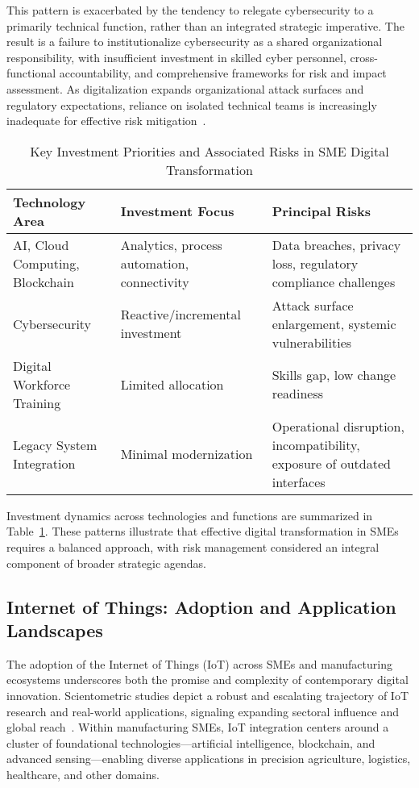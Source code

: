 \documentclass[11pt]{article}
\begin{document}
This pattern is exacerbated by the tendency to relegate cybersecurity to a primarily technical function, rather than an integrated strategic imperative. The result is a failure to institutionalize cybersecurity as a shared organizational responsibility, with insufficient investment in skilled cyber personnel, cross-functional accountability, and comprehensive frameworks for risk and impact assessment. As digitalization expands organizational attack surfaces and regulatory expectations, reliance on isolated technical teams is increasingly inadequate for effective risk mitigation~\cite{ref35}.

\begin{table}[htbp]
\centering
\caption{Key Investment Priorities and Associated Risks in SME Digital Transformation}
\label{tab:investment_risks}
\begin{tabular}{|l|p{5cm}|p{4cm}|}
\hline
\textbf{Technology Area} & \textbf{Investment Focus} & \textbf{Principal Risks} \\
\hline
AI, Cloud Computing, Blockchain & Analytics, process automation, connectivity & Data breaches, privacy loss, regulatory compliance challenges \\
\hline
Cybersecurity & Reactive/incremental investment & Attack surface enlargement, systemic vulnerabilities \\
\hline
Digital Workforce Training & Limited allocation & Skills gap, low change readiness \\
\hline
Legacy System Integration & Minimal modernization & Operational disruption, incompatibility, exposure of outdated interfaces \\
\hline
\end{tabular}
\end{table}

Investment dynamics across technologies and functions are summarized in Table~\ref{tab:investment_risks}. These patterns illustrate that effective digital transformation in SMEs requires a balanced approach, with risk management considered an integral component of broader strategic agendas.

\subsection{Internet of Things: Adoption and Application Landscapes}

The adoption of the Internet of Things (IoT) across SMEs and manufacturing ecosystems underscores both the promise and complexity of contemporary digital innovation. Scientometric studies depict a robust and escalating trajectory of IoT research and real-world applications, signaling expanding sectoral influence and global reach~\cite{ref33}. Within manufacturing SMEs, IoT integration centers around a cluster of foundational technologies—artificial intelligence, blockchain, and advanced sensing—enabling diverse applications in precision agriculture, logistics, healthcare, and other domains.
\end{document}
